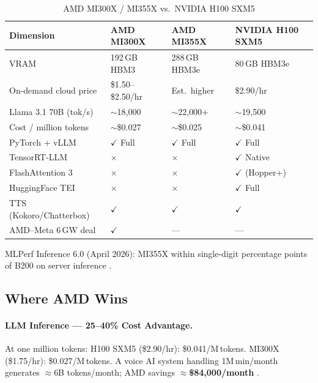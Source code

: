 \documentclass[12pt,a4paper]{article}
\begin{document}
\begin{table}[H]\centering
\caption{AMD MI300X / MI355X vs.\ NVIDIA H100 SXM5}
\label{tab:amd-vs-nvidia}
\small
\begin{tabularx}{\textwidth}{L{3.8cm}L{2.6cm}L{2.6cm}X}
\toprule
\textbf{Dimension} & \textbf{AMD MI300X} & \textbf{AMD MI355X} & \textbf{NVIDIA H100 SXM5} \\
\midrule
VRAM                    & 192\,GB HBM3       & 288\,GB HBM3e       & 80\,GB HBM3e \\
On-demand cloud price   & \$1.50--\$2.50/hr  & Est.\ higher        & \$2.90/hr \\
Llama 3.1 70B (tok/s)   & $\sim$18{,}000     & $\sim$22{,}000+     & $\sim$19{,}500 \\
Cost / million tokens   & $\sim$\$0.027      & $\sim$\$0.025       & $\sim$\$0.041 \\
PyTorch + vLLM          & $\checkmark$ Full  & $\checkmark$ Full   & $\checkmark$ Full \\
TensorRT-LLM            & $\times$           & $\times$            & $\checkmark$ Native \\
FlashAttention 3        & $\times$           & $\times$            & $\checkmark$ (Hopper+) \\
HuggingFace TEI         & $\times$           & $\times$            & $\checkmark$ Full \\
TTS (Kokoro/Chatterbox) & $\checkmark$       & $\checkmark$        & $\checkmark$ \\
AMD--Meta 6\,GW deal    & $\checkmark$       & ---                 & --- \\
\bottomrule
\end{tabularx}
\end{table}

MLPerf Inference 6.0 (April 2026): MI355X within single-digit percentage
points of B200 on server inference \cite{spheron-rocm-cuda}.

\subsection{Where AMD Wins}

\paragraph{LLM Inference --- 25--40\% Cost Advantage.}
At one million tokens:
H100 SXM5 (\$2.90/hr): \$0.041/M\,tokens.
MI300X (\$1.75/hr): \$0.027/M\,tokens.
A voice AI system handling 1M\,min/month generates $\approx$6B tokens/month;
AMD savings $\approx$\textbf{\$84{,}000/month} \cite{vllm-rocm}.
\end{document}
